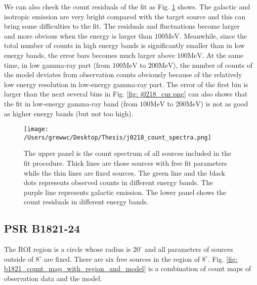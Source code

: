 \documentclass[12pt]{report}
\newcommand{\singleFig}[3]{
  \begin{figure}[!ht]
    \centering
    \texttt{[image: /Users/grewwc/Desktop/Thesis/\#1]}
    \caption{#3}
    \label{fig: #1}
  \end{figure}
}
\newcommand{\Notice}[1]{
  $<$\textbf{Notice}$>$#1$<$\textbf{/Notice}$>$
}
\begin{document}

            We can also check the count residuals of the fit as Fig. 
            \ref{fig: j0218_count_spectra} shows. The galactic and isotropic emission are very 
            bright compared with the target source and this can bring some difficulties to 
            the fit. The residuals and fluctuations become larger and more obvious 
            when the energy is larger than $100\mbox{MeV}$. 
            Meanwhile, since the total number of counts in high energy bands 
            is significantly smaller than in low energy bands, the error bars becomes much 
            larger above $100\mbox{MeV}$. At the same time, in low gamma-ray part 
            (from $100\mbox{MeV}$ to $200\mbox{MeV}$), the number of counts of the model 
            deviates from observation counts obviously because of the relatively low energy 
            resolution in low-energy gamma-ray part. The error of the first bin is larger
            than the next several bins in Fig. \ref{fig: j0218_cur.png} can also shows that 
            the fit in low-energy gamma-ray band (from $100\mbox{MeV}$ to $200\mbox{MeV}$) 
            is not as good as higher energy bands (but not too high). 
            
            \begin{figure}[!ht]
              \centering
              \texttt{[image: /Users/grewwc/Desktop/Thesis/j0218\_count\_spectra.png]}
              \caption{The upper panel is the count spectrum of all sources included in the 
                      fit procedure. Thick lines are those sources with free fit parameters 
                      while the thin lines are fixed sources. The green line and the black 
                      dots represents observed counts in different energy bands. The purple 
                      line represents galactic emission. The lower panel shows the count 
                      residuals in different energy bands. } 
              \label{fig: j0218_count_spectra}
            \end{figure}

            \subsection{PSR B1821-24}
              The ROI region is a circle whose radius is $20^\circ$ and all 
              parameters of sources outside of $8^\circ$ are fixed. 
              There are six free sources in the region of $8^\circ$. Fig.
              \ref{fig: b1821_count_map_with_region_and_model} 
              is a combination of count maps of observation data and the model. 
\end{document}
